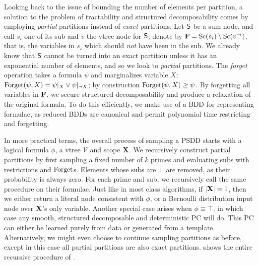 Looking back to the issue of bounding the number of elements per partition, a solution to the
problem of tractability and structured decomposability comes by employing \emph{partial} partitions
instead of \emph{exact} partitions. Let $\operatorname{\textup{\textsf{S}}}$ be a sum node, and call $s_i$ one of its sub and $v$
the vtree node for $\operatorname{\textup{\textsf{S}}}$; denote by $\mathbf{F}=\operatorname*{\normalfont{Sc}}(s_i)\setminus\operatorname*{\normalfont{Sc}}(v^\to)$, that is, the variables
in $s_i$ which should \emph{not} have been in the sub. We already know that $\operatorname{\textup{\textsf{S}}}$ cannot be turned
into an exact partition unless it has an exponential number of elements, and so we look to
\emph{partial} partitions. The \emph{forget} operation takes a formula $\psi$ and marginalizes
variable $X$: $\operatorname{\normalfont{Forget}}(\psi, X)=\psi|_X\vee\psi|_{\neg X}$; by construction $\operatorname{\normalfont{Forget}}(\psi,X)\geq
\psi$. By forgetting all variables in $\mathbf{F}$, we secure structured decomposability and produce a
relaxation of the original formula. To do this efficiently, we make use of a BDD for representing
formulae, as reduced BDDs are canonical and permit polynomial time restricting and forgetting.

In more practical terms, the overall process of sampling a PSDD starts with a logical formula
$\phi$, a vtree $\mathcal{V}$ and scope $\mathbf{X}$. We recursively construct partial partitions by
first sampling a fixed number of $k$ primes and evaluating subs with restrictions and $\operatorname{\normalfont{Forget}}$s.
Elements whose subs are $\bot$ are removed, as their probability is always zero. For each prime and sub, we
recursively call the same procedure on their formulae. Just like in most \divclass{} class
algorithms, if $|\mathbf{X}|=1$, then we either return a literal node consistent with $\phi$, or a
Bernoulli distribution input node over $\mathbf{X}$'s only variable. Another special case arises when
$\phi\equiv\top$, in which case any smooth, structured decomposable and deterministic PC will do.
This PC can either be learned purely from data or generated from a template. Alternatively, we
might even choose to continue sampling partitions as before, except in this case all partial
partitions are also exact partitions.  shows the entire recursive procedure
of .

